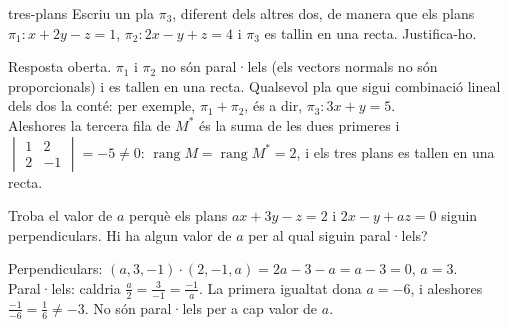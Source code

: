 \begin{apartats}
\begin{tria}{tres-plans}
Escriu un pla $\pi_3$, diferent dels altres dos, de manera que els plans $\pi_1\colon x+2y-z=1$,
$\pi_2\colon 2x-y+z=4$ i $\pi_3$ es tallin en una recta. Justifica-ho.

\begin{solucio}
Resposta oberta. $\pi_1$ i $\pi_2$ no són paral·lels (els vectors normals no són proporcionals) i es
tallen en una recta. Qualsevol pla que sigui combinació lineal dels dos la conté: per exemple,
$\pi_1+\pi_2$, és a dir, $\pi_3\colon 3x+y=5$.\\
Aleshores la tercera fila de $M^*$ és la suma de les dues primeres i
$\begin{vmatrix}1&2\\2&-1\end{vmatrix}=-5\ne0$: $\operatorname{rang}M=\operatorname{rang}M^*=2$, i els tres
plans es tallen en una recta.
\end{solucio}
\end{tria}

\begin{nomesllarg}
Troba el valor de $a$ perquè els plans $ax+3y-z=2$ i $2x-y+az=0$ siguin perpendiculars. Hi ha algun
valor de $a$ per al qual siguin paral·lels?

\begin{solucio}
Perpendiculars: $(a,3,-1)\cdot(2,-1,a)=2a-3-a=a-3=0$, $a=3$.\\
Paral·lels: caldria $\frac a2=\frac3{-1}=\frac{-1}a$. La primera igualtat dona $a=-6$, i aleshores
$\frac{-1}{-6}=\frac16\ne-3$. No són paral·lels per a cap valor de $a$.
\end{solucio}
\end{nomesllarg}

\end{apartats}

